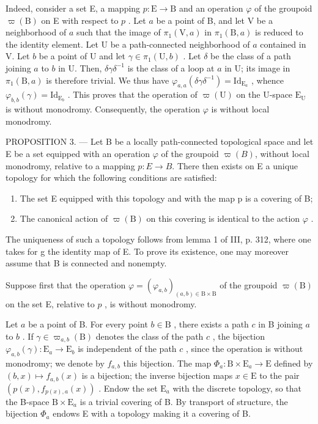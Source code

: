 Indeed, consider a set E, a mapping \(p \colon \mathrm{E} \to \mathrm{B}\) and an operation \(\varphi\) of the groupoid \(\varpi(\mathrm{B})\) on E with respect to \(p\) . Let \(a\) be a point of B, and let V be a neighborhood of \(a\) such that the image of \(\pi_1(\mathrm{V}, a)\) in \(\pi_1(\mathrm{B}, a)\) is reduced to the identity element. Let U be a path-connected neighborhood of \(a\) contained in V. Let \(b\) be a point of U and let \(\gamma \in \pi_1(\mathrm{U}, b)\) . Let \(\delta\) be the class of a path joining \(a\) to \(b\) in U. Then, \(\delta\gamma\delta^{-1}\) is the class of a loop at \(a\) in U; its image in \(\pi_1(\mathrm{B}, a)\) is therefore trivial. We thus have \(\varphi_{a,a}(\delta\gamma\delta^{-1}) = \mathrm{Id}_{\mathrm{E}_a}\) , whence \(\varphi_{b,b}(\gamma) = \mathrm{Id}_{\mathrm{E}_b}\) . This proves that the operation of \(\varpi(\mathrm{U})\) on the U-space \(\mathrm{E_U}\) is without monodromy. Consequently, the operation \(\varphi\) is without local monodromy.

PROPOSITION 3. --- Let B be a locally path-connected topological space and let E be a set equipped with an operation \(\varphi\) of the groupoid \(\varpi(B)\), without local monodromy, relative to a mapping \(p: E \to B\). There then exists on E a unique topology for which the following conditions are satisfied:

\begin{enumerate}
\def\labelenumi{(\roman{enumi})}
\item
  The set E equipped with this topology and with the map p is a covering of B;
\item
  The canonical action of \(\varpi(\mathrm{B})\) on this covering is identical to the action \(\varphi\) .
\end{enumerate}

The uniqueness of such a topology follows from lemma 1 of III, p. 312, where one takes for g the identity map of E. To prove its existence, one may moreover assume that B is connected and nonempty.

Suppose first that the operation \(\varphi = (\varphi_{a,b})_{(a,b)\in \mathrm{B}\times \mathrm{B}}\) of the groupoid \(\varpi (\mathrm{B})\) on the set E, relative to \(p\) , is without monodromy.

Let \(a\) be a point of B. For every point \(b \in \mathrm{B}\) , there exists a path \(c\) in B joining \(a\) to \(b\) . If \(\gamma \in \varpi_{a,b}(\mathrm{B})\) denotes the class of the path \(c\) , the bijection \(\varphi_{a,b}(\gamma) \colon \mathrm{E}_a \to \mathrm{E}_b\) is independent of the path \(c\) , since the operation is without monodromy; we denote by \(f_{a,b}\) this bijection. The map \(\Phi_a \colon \mathrm{B} \times \mathrm{E}_a \to \mathrm{E}\) defined by \((b,x) \mapsto f_{a,b}(x)\) is a bijection; the inverse bijection maps \(x \in \mathrm{E}\) to the pair \((p(x), f_{p(x),a}(x))\) . Endow the set \(\mathrm{E}_a\) with the discrete topology, so that the B-space \(\mathrm{B} \times \mathrm{E}_a\) is a trivial covering of B. By transport of structure, the bijection \(\Phi_a\) endows E with a topology making it a covering of B.

